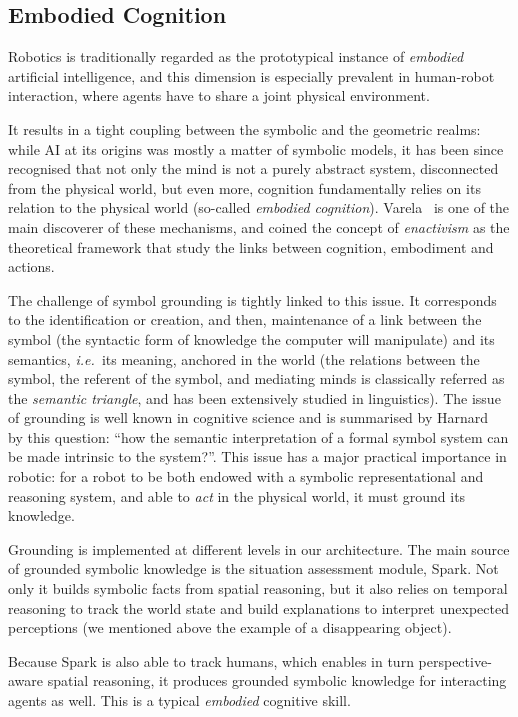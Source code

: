 \documentclass[preprint,3p,times]{elsarticle}
\newcommand{\ie}{{\textit{i.e.\ }}}
\begin{document}
\subsection{Embodied Cognition}

Robotics is traditionally regarded as the prototypical instance of \emph{embodied}
artificial intelligence, and this dimension is especially prevalent in
human-robot interaction, where agents have to share a joint physical
environment.

It results in a tight coupling between the symbolic and the geometric realms:
while AI at its origins was mostly a matter of symbolic models, it has been
since recognised that not only the mind is not a purely abstract system,
disconnected from the physical world, but even more, cognition fundamentally
relies on its relation to the physical world (so-called \emph{embodied
cognition}). Varela~\cite{Varela1992} is one of the main discoverer of these
mechanisms, and coined the concept of \emph{enactivism} as the theoretical
framework that study the links between cognition, embodiment and actions.

The challenge of symbol grounding is tightly linked to this issue. It
corresponds to the identification or creation, and then, maintenance of a link
between the symbol (the syntactic form of knowledge the computer will
manipulate) and its semantics, \ie its meaning, anchored in the world (the
relations between the symbol, the referent of the symbol, and mediating minds
is classically referred as the \emph{semantic triangle}, and has been
extensively studied in linguistics). The issue of grounding is well known in
cognitive science and is summarised by Harnard~\cite{Harnad1990} by this
question: ``how the semantic interpretation of a formal symbol system can be
made intrinsic to the system?''. This issue has a major practical importance in
robotic: for a robot to be both endowed with a symbolic representational and
reasoning system, and able to \emph{act} in the physical world, it must ground
its knowledge.

Grounding is implemented at different levels in our architecture. The main source
of grounded symbolic knowledge is the situation assessment module, {\sc Spark}.
Not only it builds symbolic facts from spatial reasoning, but it also relies on
temporal reasoning to track the world state and build explanations to interpret
unexpected perceptions (we mentioned above the example of a disappearing
object).

Because {\sc Spark} is also able to track humans, which enables in turn
perspective-aware spatial reasoning, it produces grounded symbolic knowledge
for interacting agents as well. This is a typical \emph{embodied} cognitive
skill.
\end{document}
